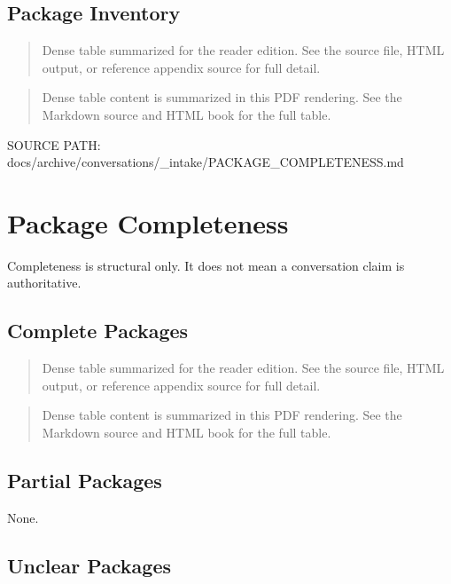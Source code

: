 \documentclass[11pt,a4paper]{report}
\begin{document}
\subsection{Package Inventory}


\begin{quote}\small Dense table summarized for the reader edition. See the source file, HTML output, or reference appendix source for full detail.\end{quote}

\begin{quote}\small Dense table content is summarized in this PDF rendering. See the Markdown source and HTML book for the full table.\end{quote}



{\small\raggedright SOURCE PATH: docs/\allowbreak{}archive/\allowbreak{}conversations/\allowbreak{}\_\allowbreak{}intake/\allowbreak{}PACKAGE\_\allowbreak{}COMPLETENESS.md\par}


\section{Package Completeness}

Completeness is structural only. It does not mean a conversation claim is authoritative.


\subsection{Complete Packages}


\begin{quote}\small Dense table summarized for the reader edition. See the source file, HTML output, or reference appendix source for full detail.\end{quote}

\begin{quote}\small Dense table content is summarized in this PDF rendering. See the Markdown source and HTML book for the full table.\end{quote}


\subsection{Partial Packages}

None.


\subsection{Unclear Packages}
\end{document}

